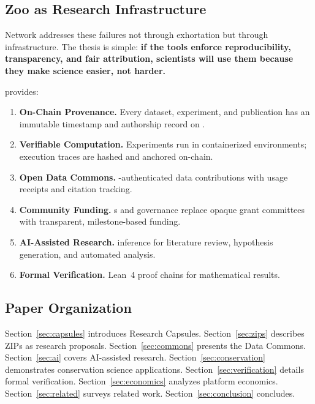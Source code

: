 \subsection{Zoo as Research Infrastructure}

\Zoo{} Network addresses these failures not through exhortation but through infrastructure. The thesis is simple: \textbf{if the tools enforce reproducibility, transparency, and fair attribution, scientists will use them because they make science easier, not harder.}

\Zoo{} provides:

\begin{enumerate}
    \item \textbf{On-Chain Provenance.} Every dataset, experiment, and publication has an immutable timestamp and authorship record on \IChain{}.
    \item \textbf{Verifiable Computation.} Experiments run in containerized environments; execution traces are hashed and anchored on-chain.
    \item \textbf{Open Data Commons.} \DID{}-authenticated data contributions with usage receipts and citation tracking.
    \item \textbf{Community Funding.} \ZIP{}s and \DAO{} governance replace opaque grant committees with transparent, milestone-based funding.
    \item \textbf{AI-Assisted Research.} \AChain{} inference for literature review, hypothesis generation, and automated analysis.
    \item \textbf{Formal Verification.} Lean~4 proof chains for mathematical results.
\end{enumerate}

\subsection{Paper Organization}

Section~\ref{sec:capsules} introduces Research Capsules. Section~\ref{sec:zips} describes ZIPs as research proposals. Section~\ref{sec:commons} presents the Data Commons. Section~\ref{sec:ai} covers AI-assisted research. Section~\ref{sec:conservation} demonstrates conservation science applications. Section~\ref{sec:verification} details formal verification. Section~\ref{sec:economics} analyzes platform economics. Section~\ref{sec:related} surveys related work. Section~\ref{sec:conclusion} concludes.

